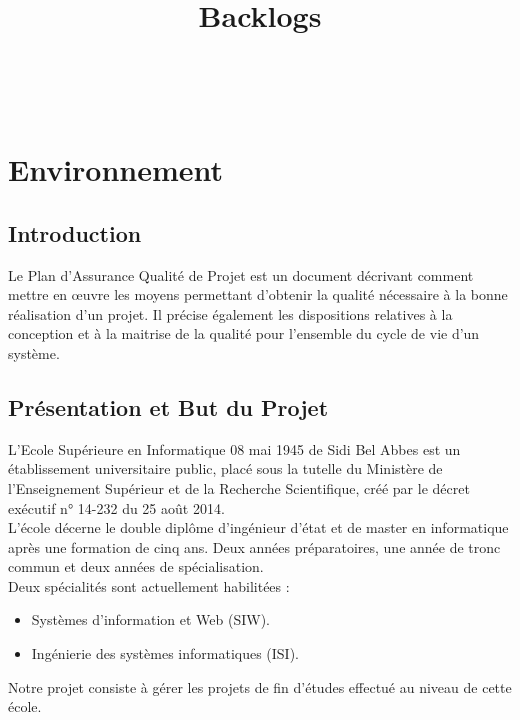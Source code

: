 \documentclass[11pt,fleqn]{book} %
\begin{document}
\title{Backlogs}

\begingroup
{}
\endgroup


\newpage
~\vfill
\thispagestyle{empty}


\pagestyle{empty} %

\tableofcontents

\pagestyle{fancy} %

\chapter{Environnement}
\section{Introduction}
Le Plan d’Assurance Qualité de Projet est un document décrivant comment mettre en œuvre les moyens permettant d’obtenir la qualité nécessaire à la bonne réalisation d’un projet. Il précise également les dispositions relatives à la conception et à la maitrise de la qualité pour l’ensemble du cycle de vie d’un système. 
\section{Présentation et But du Projet}
L’Ecole Supérieure en Informatique 08 mai 1945 de Sidi Bel Abbes est un établissement universitaire public, placé sous la tutelle du Ministère de l'Enseignement Supérieur et de la Recherche Scientifique, créé par le décret exécutif n° 14-232 du 25 août 2014. \\
L'école décerne le double diplôme d'ingénieur d’état et de master en informatique après une formation de cinq ans. Deux années préparatoires, une année de tronc commun et deux années de spécialisation. \\
Deux spécialités sont actuellement habilitées : 
\begin{itemize}
    \item Systèmes d'information et Web (SIW).
    \item Ingénierie des systèmes informatiques (ISI).
\end{itemize}
Notre projet consiste à gérer les projets de fin d’études effectué au niveau de cette école.
\newpage
\end{document}
